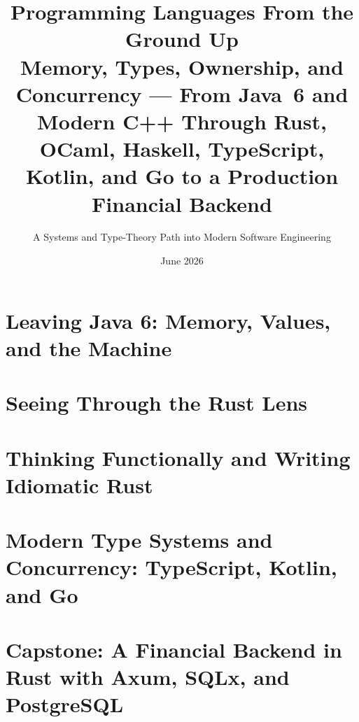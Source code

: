 \documentclass[11pt]{book}
\title{\textbf{Programming Languages From the Ground Up}\\[0.4em]\large Memory, Types, Ownership, and Concurrency --- From Java~6 and Modern C++ Through Rust, OCaml, Haskell, TypeScript, Kotlin, and Go to a Production Financial Backend}
\author{A Systems and Type-Theory Path into Modern Software Engineering}
\date{June 2026}
\begin{document}
\frontmatter
\maketitle

\tableofcontents

\mainmatter

\part{Leaving Java 6: Memory, Values, and the Machine}



\part{Seeing Through the Rust Lens}





\part{Thinking Functionally and Writing Idiomatic Rust}



\part{Modern Type Systems and Concurrency: TypeScript, Kotlin, and Go}




\part{Capstone: A Financial Backend in Rust with Axum, SQLx, and PostgreSQL}



\end{document}
